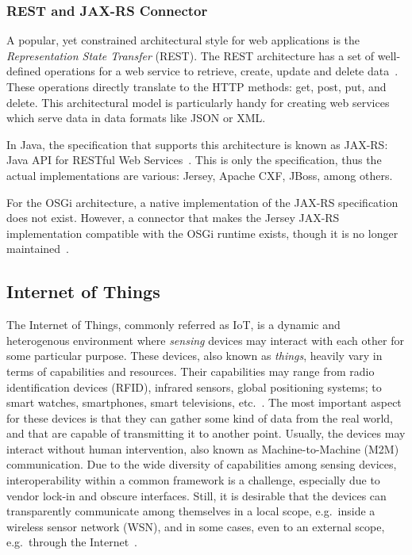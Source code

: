 \documentclass[12pt]{article}
\begin{document}
\subsubsection{REST and JAX-RS Connector}

A popular, yet constrained architectural style for web applications is the \emph{Representation State Transfer} (REST). The REST architecture has a set of well-defined operations for a web service to retrieve, create, update and delete data~\cite{rest_01}. These operations directly translate to the HTTP methods: get, post, put, and delete. This architectural model is particularly handy for creating web services which serve data in data formats like JSON or XML.

In Java, the specification that supports this architecture is known as JAX-RS: Java API for RESTful Web Services~\cite{rest_02}. This is only the specification, thus the actual implementations are various: Jersey, Apache CXF, JBoss, among others.

For the OSGi architecture, a native implementation of the JAX-RS specification does not exist. However, a connector that makes the Jersey JAX-RS implementation compatible with the OSGi runtime exists, though it is no longer maintained~\cite{rest_03}.

\subsection{Internet of Things}
\label{ssec:iot}
The Internet of Things, commonly referred as IoT, is a dynamic and heterogenous environment where \emph{sensing} devices may interact with each other for some particular purpose. These devices, also known as \emph{things}, heavily vary in terms of capabilities and resources. Their capabilities may range from radio identification devices (RFID), infrared sensors, global positioning systems; to smart watches, smartphones, smart televisions, etc.~\cite{ALABA201710}. The most important aspect for these devices is that they can gather some kind of data from the real world, and that are capable of transmitting it to another point. Usually, the devices may interact without human intervention, also known as Machine-to-Machine (M2M) communication. Due to the wide diversity of capabilities among sensing devices, interoperability within a common framework is a challenge, especially due to vendor lock-in and obscure interfaces. Still, it is desirable that the devices can transparently communicate among themselves in a local scope, e.g.\ inside a wireless sensor network (WSN), and in some cases, even to an external scope, e.g.\ through the Internet~\cite{Zhang:2015}.
\end{document}
